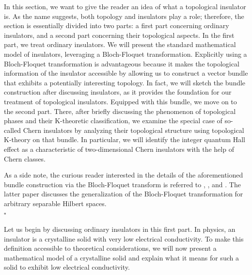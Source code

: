 \nocite{0e533eef}
\nocite{3e24354b}
\nocite{37e40023}
\nocite{5cb8b651}
\nocite{9104a30f}
\nocite{99aba7f6}
\nocite{9fc084b2}
\nocite{c9fb3de7}
\nocite{ce883d84}
\nocite{d02f3620}
\nocite{eda79af1}
\nocite{f94459b0}
\nocite{5914f1ad}
In this section, we want to give the reader an idea of what a topological insulator is.
As the name suggests, both topology and insulators play a role; therefore, the section is essentially divided into two parts: a first part concerning ordinary insulators, and a second part concerning their topological aspects.
In the first part, we treat ordinary insulators.
We will present the standard mathematical model of insulators, leveraging a Bloch-Floquet transformation.
Explicitly using a Bloch-Floquet transformation is advantageous because it makes the topological information of the insulator accessible by allowing us to construct a vector bundle that exhibits a potentially interesting topology.
In fact, we will sketch the bundle construction after discussing insulators, as it provides the foundation for our treatment of topological insulators.
Equipped with this bundle, we move on to the second part.
There, after briefly discussing the phenomenon of topological phases and their K-theoretic classification, we examine the special case of so-called Chern insulators by analyzing their topological structure using topological K-theory on that bundle.
In particular, we will identify the integer quantum Hall effect as a characteristic of two-dimensional Chern insulators with the help of Chern classes.
\\
\begin{rem}
\label{rem:blochfloquet}
As a side note, the curious reader interested in the details of the aforementioned bundle construction via the Bloch-Floquet transform is referred to \cite{9fc084b2}, \cite{d02f3620}, and \cite{ce883d84}.
The latter paper discusses the generalization of the Bloch-Floquet transformation for arbitrary separable Hilbert spaces.
\\
\phantom{proven}
\hfill
$\square$
\\
\end{rem}
Let us begin by discussing ordinary insulators in this first part.
In physics, an insulator is a crystalline solid with very low electrical conductivity.
To make this definition accessible to theoretical considerations, we will now present a mathematical model of a {\glqq}crystalline solid{\grqq} and explain what it means for such a solid to exhibit {\glqq}low electrical conductivity.{\grqq}
\\
